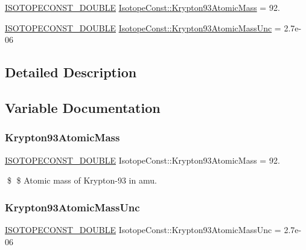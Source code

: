 \begin{DoxyCompactItemize}
\item 
\mbox{\hyperlink{group___isotope_const-_macros_ga8f45a7272ce02c0b4c65c44636ed719a}{I\+S\+O\+T\+O\+P\+E\+C\+O\+N\+S\+T\+\_\+\+D\+O\+U\+B\+LE}} \mbox{\hyperlink{group___isotope_const-_krypton-_kr93_ga29787e866f120558c4c61bbb82d66504}{Isotope\+Const\+::\+Krypton93\+Atomic\+Mass}} = 92.
\item 
\mbox{\hyperlink{group___isotope_const-_macros_ga8f45a7272ce02c0b4c65c44636ed719a}{I\+S\+O\+T\+O\+P\+E\+C\+O\+N\+S\+T\+\_\+\+D\+O\+U\+B\+LE}} \mbox{\hyperlink{group___isotope_const-_krypton-_kr93_gad9f64b18fb581d25170c40f8074a3303}{Isotope\+Const\+::\+Krypton93\+Atomic\+Mass\+Unc}} = 2.\+7e-\/06
\end{DoxyCompactItemize}


\subsection{Detailed Description}


\subsection{Variable Documentation}
\mbox{\label{group___isotope_const-_krypton-_kr93_ga29787e866f120558c4c61bbb82d66504}} 
\subsubsection{\texorpdfstring{Krypton93\+Atomic\+Mass}{Krypton93AtomicMass}}
{\footnotesize\ttfamily \mbox{\hyperlink{group___isotope_const-_macros_ga8f45a7272ce02c0b4c65c44636ed719a}{I\+S\+O\+T\+O\+P\+E\+C\+O\+N\+S\+T\+\_\+\+D\+O\+U\+B\+LE}} Isotope\+Const\+::\+Krypton93\+Atomic\+Mass = 92.}

\$ \$ Atomic mass of Krypton-\/93 in amu. \mbox{\label{group___isotope_const-_krypton-_kr93_gad9f64b18fb581d25170c40f8074a3303}} 
\subsubsection{\texorpdfstring{Krypton93\+Atomic\+Mass\+Unc}{Krypton93AtomicMassUnc}}
{\footnotesize\ttfamily \mbox{\hyperlink{group___isotope_const-_macros_ga8f45a7272ce02c0b4c65c44636ed719a}{I\+S\+O\+T\+O\+P\+E\+C\+O\+N\+S\+T\+\_\+\+D\+O\+U\+B\+LE}} Isotope\+Const\+::\+Krypton93\+Atomic\+Mass\+Unc = 2.\+7e-\/06}

